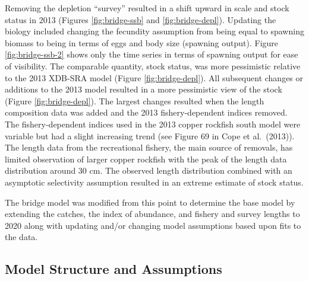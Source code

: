 \documentclass[11pt,
  english,
  a4paper,
]{article}
\begin{document}

Removing the depletion ``survey'' resulted in a shift upward in scale and stock status in 2013 (Figures \ref{fig:bridge-ssb} and \ref{fig:bridge-depl}). Updating the biology included changing the fecundity assumption from being equal to spawning biomass to being in terms of eggs and body size (spawning output). Figure \ref{fig:bridge-ssb-2} shows only the time series in terms of spawning output for ease of visibility. The comparable quantity, stock status, was more pessimistic relative to the 2013 XDB-SRA model (Figure \ref{fig:bridge-depl}). All subsequent changes or additions to the 2013 model resulted in a more pessimistic view of the stock (Figure \ref{fig:bridge-depl}). The largest changes resulted when the length composition data was added and the 2013 fishery-dependent indices removed. The fishery-dependent indices used in the 2013 copper rockfish south model were variable but had a slight increasing trend (see Figure 69 in Cope et al.~{(2013)\leavevmode\tagmcend\tagstructend}). The length data from the recreational fishery, the main source of removals, has limited observation of larger copper rockfish with the peak of the length data distribution around 30 cm. The observed length distribution combined with an asymptotic selectivity assumption resulted in an extreme estimate of stock status.

\leavevmode\tagmcend\tagstructend\par


The bridge model was modified from this point to determine the base model by extending the catches, the index of abundance, and fishery and survey lengths to 2020 along with updating and/or changing model assumptions based upon fits to the data.

\leavevmode\tagmcend\tagstructend\par


\hypertarget{model-structure-and-assumptions}{%
\subsection{Model Structure and Assumptions}\label{model-structure-and-assumptions}}

\leavevmode\tagmcend\tagstructend

\end{document}
